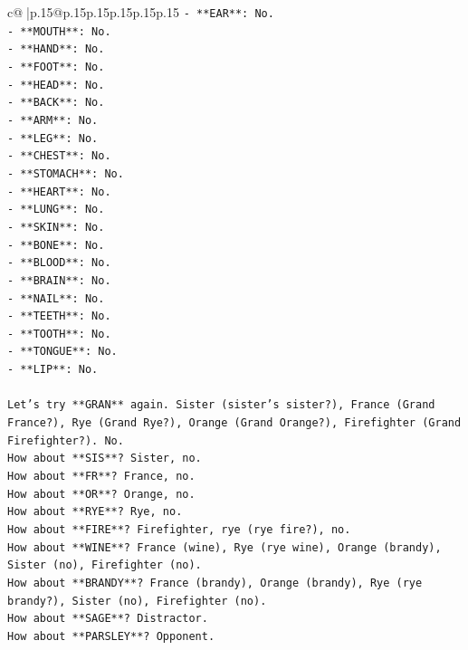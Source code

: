 \documentclass{article}
\begin{document}
{\begin{supertabular}{c@{$\;$}|p{.15\linewidth}@{}p{.15\linewidth}p{.15\linewidth}p{.15\linewidth}p{.15\linewidth}p{.15\linewidth}}
{{{\texttt{{-} **EAR**: No.} \\
\texttt{{-} **MOUTH**: No.} \\
\texttt{{-} **HAND**: No.} \\
\texttt{{-} **FOOT**: No.} \\
\texttt{{-} **HEAD**: No.} \\
\texttt{{-} **BACK**: No.} \\
\texttt{{-} **ARM**: No.} \\
\texttt{{-} **LEG**: No.} \\
\texttt{{-} **CHEST**: No.} \\
\texttt{{-} **STOMACH**: No.} \\
\texttt{{-} **HEART**: No.} \\
\texttt{{-} **LUNG**: No.} \\
\texttt{{-} **SKIN**: No.} \\
\texttt{{-} **BONE**: No.} \\
\texttt{{-} **BLOOD**: No.} \\
\texttt{{-} **BRAIN**: No.} \\
\texttt{{-} **NAIL**: No.} \\
\texttt{{-} **TEETH**: No.} \\
\texttt{{-} **TOOTH**: No.} \\
\texttt{{-} **TONGUE**: No.} \\
\texttt{{-} **LIP**: No.} \\
\\ 
\texttt{Let's try **GRAN** again. Sister (sister's sister?), France (Grand France?), Rye (Grand Rye?), Orange (Grand Orange?), Firefighter (Grand Firefighter?). No.} \\
\texttt{How about **SIS**? Sister, no.} \\
\texttt{How about **FR**? France, no.} \\
\texttt{How about **OR**? Orange, no.} \\
\texttt{How about **RYE**? Rye, no.} \\
\texttt{How about **FIRE**? Firefighter, rye (rye fire?), no.} \\
\texttt{How about **WINE**? France (wine), Rye (rye wine), Orange (brandy), Sister (no), Firefighter (no).} \\
\texttt{How about **BRANDY**? France (brandy), Orange (brandy), Rye (rye brandy?), Sister (no), Firefighter (no).} \\
\texttt{How about **SAGE**? Distractor.} \\
\texttt{How about **PARSLEY**? Opponent.} \\
}}}
\end{supertabular}}
\end{document}
